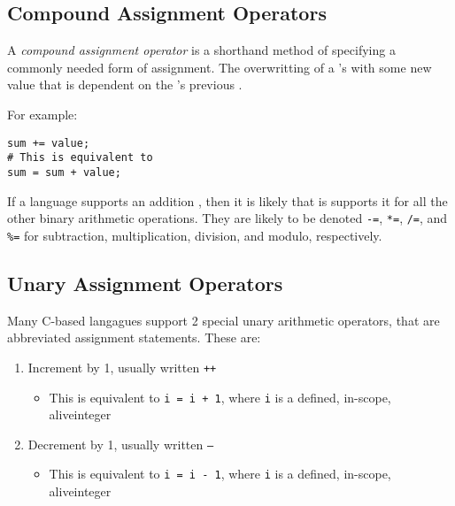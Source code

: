 \subsection{Compound Assignment Operators}\label{subsec:Compound_Assignment_Operators}
\begin{definition}\label{def:Compound_Assignment_Operator}
  A \emph{compound assignment operator} is a shorthand method of specifying a commonly needed form of assignment.
  The overwritting of a 's  with some new value that is dependent on the 's previous .

  For example:
\begin{verbatim}
sum += value;
# This is equivalent to
sum = sum + value;
\end{verbatim}

  \begin{remark}\label{rmk:Supported_Compount_Assignment_Operators}
    If a language supports an addition , then it is likely that is supports it for all the other binary arithmetic operations.
    They are likely to be denoted \texttt{-=}, \texttt{*=}, \texttt{/=}, and \texttt{\%=} for subtraction, multiplication, division, and modulo, respectively.
  \end{remark}
\end{definition}

\subsection{Unary Assignment Operators}\label{subsec:Unary_Assignment_Operators}
Many C-based langagues support 2 special unary arithmetic operators, that are abbreviated assignment statements.
These are:
\begin{enumerate}[noitemsep]
\item Increment by 1, usually written \texttt{++}
  \begin{itemize}[noitemsep]
  \item This is equivalent to \texttt{i = i + 1}, where \texttt{i} is a defined, in-scope, aliveinteger 
  \end{itemize}
\item Decrement by 1, usually written \texttt{--}
  \begin{itemize}[noitemsep]
  \item This is equivalent to \texttt{i = i - 1}, where \texttt{i} is a defined, in-scope, aliveinteger 
  \end{itemize}
\end{enumerate}

